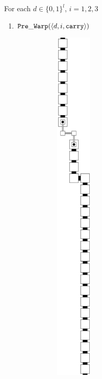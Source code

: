         For each $d \in \{0, 1\}^l$, $i = 1, 2, 3$

        \begin{enumerate}[label={--}]

            \item ${\tt Pre\_Warp}   (\langle d, i, {\tt carry}\rangle)$
                \begin{figure}[H]
                    \begin{subfigure}[t]{0.2\textwidth}
                        \centering
                        \includegraphics[width=0.2\textwidth]{warping/pre_warp_general}

\end{subfigure}
\end{figure}
\end{enumerate}
